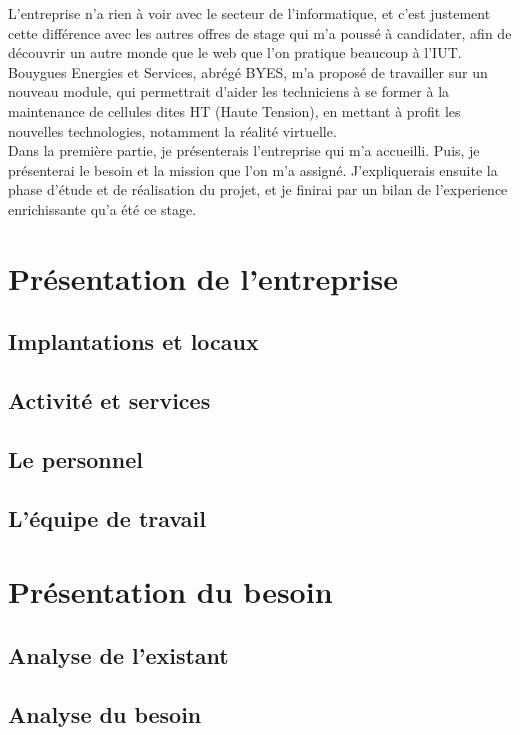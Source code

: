 \documentclass[a4paper]{article}
\begin{document}
    L'entreprise n'a rien à voir avec le secteur de l'informatique, et c'est justement cette différence avec les autres offres de stage qui m'a poussé à candidater, afin de découvrir un autre monde que le web que l'on pratique beaucoup à l'IUT. \\
    
    Bouygues Energies et Services, abrégé BYES, m'a proposé de travailler sur un nouveau module, qui permettrait d'aider les techniciens à se former à la maintenance de cellules dites HT (Haute Tension), en mettant à profit les nouvelles technologies, notamment la réalité virtuelle. \\

    Dans la première partie, je présenterais l'entreprise qui m'a accueilli. Puis, je présenterai le besoin et la mission que l'on m'a assigné. J'expliquerais ensuite la phase d'étude et de réalisation du projet, et je finirai par un bilan de l'experience enrichissante qu'a été ce stage. \\

    \newpage 
    \section{Présentation de l'entreprise}
    \subsection{Implantations et locaux}
    \subsection{Activité et services}
    \subsection{Le personnel}
    \subsection{L'équipe de travail}
    
    \section{Présentation du besoin}
    \subsection{Analyse de l'existant}
    \subsection{Analyse du besoin}
\end{document}
